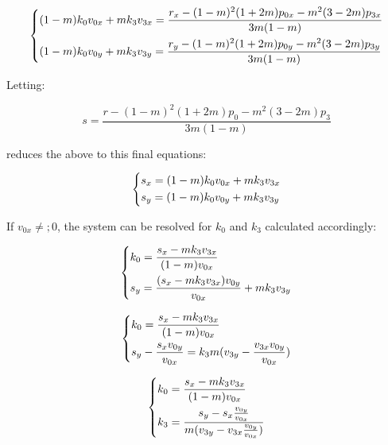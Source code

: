 \documentclass{scrartcl}
\begin{document}
\begin{equation*}
\begin{dcases}
    (1-m) k_0 v_{0x} + m k_3 v_{3x} = \frac{r_x - (1-m)^2 (1+2m) p_{0x} - m^2 (3-2m) p_{3x}}{3m (1-m)} \\
    (1-m) k_0 v_{0y} + m k_3 v_{3y} = \frac{r_y - (1-m)^2 (1+2m) p_{0y} - m^2 (3-2m) p_{3y}}{3m (1-m)} \\
\end{dcases}
\end{equation*}

Letting:

\begin{equation*}
    s = \frac{r - (1-m)^2(1+2m) p_0 - m^2(3-2m) p_3}{3m (1 - m)}
\end{equation*}

reduces the above to this final equations:

\begin{equation*}
\begin{dcases}
    s_x = (1-m) k_0 v_{0x} + m k_3 v_{3x} \\
    s_y = (1-m) k_0 v_{0y} + m k_3 v_{3y} \\
\end{dcases}
\end{equation*}

If $v_{0x} \ne; 0$, the system can be resolved for $k_0$ and $k_3$
calculated accordingly:

\begin{equation*}
\begin{dcases}
    k_0 = \frac{s_x - m k_3 v_{3x}}{(1-m) v_{0x}} \\
    s_y = \frac{(s_x - m k_3 v_{3x}) v_{0y}}{v_{0x}} + m k_3 v_{3y} \\
\end{dcases}
\end{equation*}

\begin{equation*}
\begin{dcases}
    k_0 = \frac{s_x - m k_3 v_{3x}}{(1-m) v_{0x}} \\
    s_y - \frac{s_x v_{0y}}{v_{0x}} = k_3 m (v_{3y} - \frac{v_{3x} v_{0y}}{v_{0x}}) \\
\end{dcases}
\end{equation*}

\begin{equation*}
\begin{dcases}
    k_0 = \frac{s_x - m k_3 v_{3x}}{(1-m) v_{0x}} \\
    k_3 = \frac{s_y - s_x \frac{v_{0y}}{v_{0x}}}{m (v_{3y} - v_{3x} \frac{v_{0y}}{v_{0x}})} \\
\end{dcases}
\end{equation*}
\end{document}
